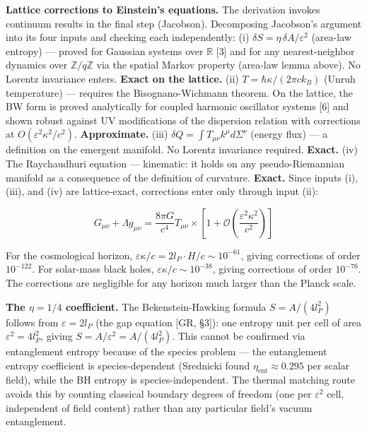 \documentclass[
]{article}
\begin{document}
\textbf{Lattice corrections to Einstein's equations.} The derivation
invokes continuum results in the final step (Jacobson). Decomposing
Jacobson's argument into its four inputs and checking each
independently: (i) \(\delta S = \eta\,\delta A/\varepsilon^2\) (area-law
entropy) --- proved for Gaussian systems over \(\mathbb{R}\) {[}3{]} and
for any nearest-neighbor dynamics over \(\mathbb{Z}/q\mathbb{Z}\) via
the spatial Markov property (area-law lemma above). No Lorentz
invariance enters. \textbf{Exact on the lattice.} (ii)
\(T = \hbar\kappa/(2\pi c k_B)\) (Unruh temperature) --- requires the
Bisognano-Wichmann theorem. On the lattice, the BW form is proved
analytically for coupled harmonic oscillator systems {[}6{]} and shown
robust against UV modifications of the dispersion relation with
corrections at \(O(\varepsilon^2\kappa^2/c^2)\). \textbf{Approximate.}
(iii) \(\delta Q = \int T_{\mu\nu} k^\mu d\Sigma^\nu\) (energy flux) ---
a definition on the emergent manifold. No Lorentz invariance required.
\textbf{Exact.} (iv) The Raychaudhuri equation --- kinematic: it holds
on any pseudo-Riemannian manifold as a consequence of the definition of
curvature. \textbf{Exact.} Since inputs (i), (iii), and (iv) are
lattice-exact, corrections enter only through input (ii):

\[G_{\mu\nu} + \Lambda g_{\mu\nu} = \frac{8\pi G}{c^4} T_{\mu\nu} \times \left[1 + \mathcal{O}\!\left(\frac{\varepsilon^2 \kappa^2}{c^2}\right)\right]\]

For the cosmological horizon,
\(\varepsilon\kappa/c = 2l_P \cdot H/c \sim 10^{-61}\), giving
corrections of order \(10^{-122}\). For solar-mass black holes,
\(\varepsilon\kappa/c \sim 10^{-38}\), giving corrections of order
\(10^{-76}\). The corrections are negligible for any horizon much larger
than the Planck scale.

\textbf{The \(\eta = 1/4\) coefficient.} The Bekenstein-Hawking formula
\(S = A/(4l_P^2)\) follows from \(\varepsilon = 2l_P\) (the gap equation
{[}GR, §3{]}): one entropy unit per cell of area
\(\varepsilon^2 = 4l_P^2\), giving \(S = A/\varepsilon^2 = A/(4l_P^2)\).
This cannot be confirmed via entanglement entropy because of the species
problem --- the entanglement entropy coefficient is species-dependent
(Srednicki found \(\eta_{\text{ent}} \approx 0.295\) per scalar field),
while the BH entropy is species-independent. The thermal matching route
avoids this by counting classical boundary degrees of freedom (one per
\(\varepsilon^2\) cell, independent of field content) rather than any
particular field's vacuum entanglement.
\end{document}
